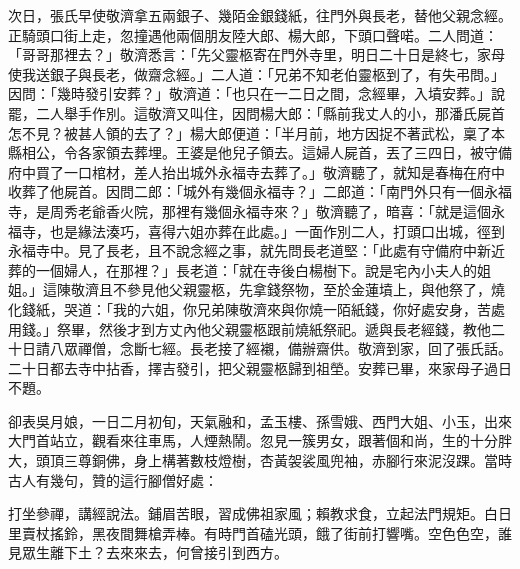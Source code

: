 次日，張氏早使敬濟拿五兩銀子、幾陌金銀錢紙，往門外與長老，替他父親念經。正騎頭口街上走，忽撞遇他兩個朋友陸大郎、楊大郎，下頭口聲喏。二人問道： 「哥哥那裡去？」敬濟悉言：「先父靈柩寄在門外寺里，明日二十日是終七，家母使我送銀子與長老，做齋念經。」二人道：「兄弟不知老伯靈柩到了，有失弔問。」因問：「幾時發引安葬？」敬濟道：「也只在一二日之間，念經畢，入墳安葬。」說罷，二人舉手作別。這敬濟又叫住，因問楊大郎：「縣前我丈人的小，那潘氏屍首怎不見？被甚人領的去了？」楊大郎便道：「半月前，地方因捉不著武松，稟了本縣相公，令各家領去葬埋。王婆是他兒子領去。這婦人屍首，丟了三四日，被守備府中買了一口棺材，差人抬出城外永福寺去葬了。」敬濟聽了，就知是春梅在府中收葬了他屍首。因問二郎：「城外有幾個永福寺？」二郎道：「南門外只有一個永福寺，是周秀老爺香火院，那裡有幾個永福寺來？」敬濟聽了，暗喜：「就是這個永福寺，也是緣法湊巧，喜得六姐亦葬在此處。」一面作別二人，打頭口出城，徑到永福寺中。見了長老，且不說念經之事，就先問長老道堅：「此處有守備府中新近葬的一個婦人，在那裡？」長老道：「就在寺後白楊樹下。說是宅內小夫人的姐姐。」這陳敬濟且不參見他父親靈柩，先拿錢祭物，至於金蓮墳上，與他祭了，燒化錢紙，哭道：「我的六姐，你兄弟陳敬濟來與你燒一陌紙錢，你好處安身，苦處用錢。」祭畢，然後才到方丈內他父親靈柩跟前燒紙祭祀。遞與長老經錢，教他二十日請八眾禪僧，念斷七經。長老接了經襯，備辦齋供。敬濟到家，回了張氏話。二十日都去寺中拈香，擇吉發引，把父親靈柩歸到祖塋。安葬已畢，來家母子過日不題。

卻表吳月娘，一日二月初旬，天氣融和，孟玉樓、孫雪娥、西門大姐、小玉，出來大門首站立，觀看來往車馬，人煙熱鬧。忽見一簇男女，跟著個和尚，生的十分胖大，頭頂三尊銅佛，身上構著數枝燈樹，杏黃袈裟風兜袖，赤腳行來泥沒踝。當時古人有幾句，贊的這行腳僧好處：

打坐參禪，講經說法。鋪眉苦眼，習成佛祖家風；賴教求食，立起法門規矩。白日里賣杖搖鈴，黑夜間舞槍弄棒。有時門首磕光頭，餓了街前打響嘴。空色色空，誰見眾生離下土？去來來去，何曾接引到西方。

